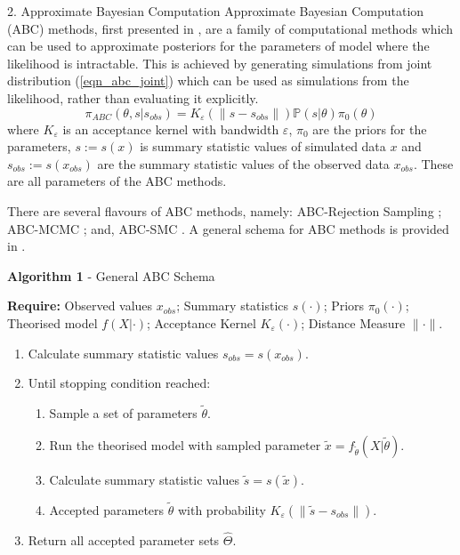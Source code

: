 \documentclass[ %
                  author={Dominic Hutchinson},
                supervisor={Dr. Daniel Lawson \& Dr. Sam Tickle},
                    degree={MEng Maths and Computer Science},
                     title={Bayesian Modelling of Epidemic Events},
                  subtitle={Summary Statistic Selection for Approximate Bayesian Computation Methods},
                      type={},
                      year={2021}
               ]{poster}
\begin{document}
\begin{frame}{}
\begin{columns}[t]
\begin{column}{0.475\linewidth}
\begin{block}{\Large 2. Approximate Bayesian Computation}
        Approximate Bayesian Computation (ABC) methods, first presented in \cite[]{inferring_coalescence_times_from_dna_sequence_data}, are a family of computational methods which can be used to approximate posteriors for the parameters of model where the likelihood is intractable. This is achieved by generating simulations from joint distribution (\ref{eqn_abc_joint}) which can be used as simulations from the likelihood, rather than evaluating it explicitly.
        \begin{equation}\label{eqn_abc_joint}
          \pi_{ABC}(\theta,s|s_{obs})=K_\varepsilon(\|s-s_{obs}\|)\mathbb{P}(s|\theta)\pi_0(\theta)
        \end{equation}
        where $K_\varepsilon$ is an acceptance kernel with bandwidth $\varepsilon$, $\pi_0$ are the priors for the parameters, $s:=s(x)$ is summary statistic values of simulated data $x$ and $s_{obs}:=s(x_{obs})$ are the summary statistic values of the observed data $x_{obs}$. These are all parameters of the ABC methods.
        \par There are several flavours of ABC methods, namely: ABC-Rejection Sampling \cite[]{inferring_coalescence_times_from_dna_sequence_data}; ABC-MCMC \cite[]{mcmc_wo_likelihood}; and, ABC-SMC \cite[]{SMC_wo_likelihood}. A general schema for ABC methods is provided in .

      \end{block}

      \begin{block}{\footnotesize \textbf{Algorithm 1} - General ABC Schema }
        {\footnotesize
          \par\textbf{Require:} Observed values $x_{obs}$; Summary statistics $s(\cdot)$; Priors $\pi_0(\cdot)$; Theorised model $f(X|\cdot)$; Acceptance Kernel $K_\varepsilon(\cdot)$; Distance Measure $\|\cdot\|$.
          \begin{enumerate}[label=\arabic*,font=\footnotesize]
            \item Calculate summary statistic values $s_{obs}=s(x_{obs})$.
            \item Until stopping condition reached:
            \begin{enumerate}[label=\Roman*,font=\footnotesize]
              \item Sample a set of parameters $\tilde\theta$.
              \item Run the theorised model with sampled parameter $\tilde{x}=f_{\tilde\theta}(X|\tilde\theta)$.
              \item Calculate summary statistic values $\tilde{s}=s(\tilde{x})$.
              \item Accepted parameters $\tilde\theta$ with probability $K_\varepsilon(\|\tilde{s}-s_{obs}\|)$.
            \end{enumerate}
            \item Return all accepted parameter sets $\hat\Theta$.
          \end{enumerate}
        }
      \end{block}


\end{column}
\end{columns}
\end{frame}
\end{document}
